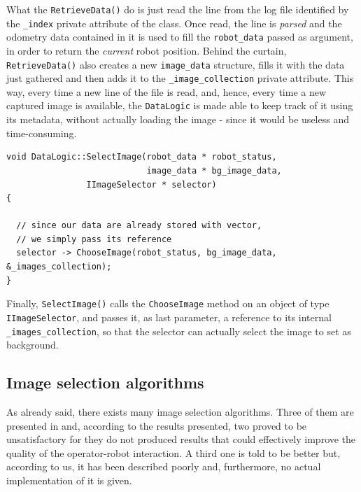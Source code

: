 %
What the \texttt{RetrieveData()} do is just read the line from the log 
file identified by the \texttt{\_index} private attribute of the class.
Once read, the line is \textit{parsed} and the odometry data contained 
in it is used to fill the \texttt{robot\_data} passed as argument, in 
order to return the \textit{current} robot position.
%
Behind the curtain, \texttt{RetrieveData()} also creates a new 
\texttt{image\_data} structure, fills it with the data just 
gathered and then adds it to the \texttt{\_image\_collection} 
private attribute.
%
This way, every time a new line of the file is read, and, hence, 
every time a new captured image is available, the \texttt{DataLogic} 
is made able to keep track of it using its metadata, without actually 
loading the image - since it would be useless and time-consuming.
%
\begin{lstlisting}[caption={\texttt{DataLogic::SelectImage()} method}, label={code:selectimage_method}, frame=trBL]
void DataLogic::SelectImage(robot_data * robot_status,
                            image_data * bg_image_data,
			    IImageSelector * selector)
{

  // since our data are already stored with vector,
  // we simply pass its reference
  selector -> ChooseImage(robot_status, bg_image_data, &_images_collection);
}
\end{lstlisting}
%
Finally, \texttt{SelectImage()} calls the \texttt{ChooseImage} method 
on an object of type \texttt{IImageSelector}, and passes it, as last 
parameter, a reference to its internal \texttt{\_images\_collection}, 
so that the selector can actually select the image to set as 
background.
%
%
%
\subsection{Image selection algorithms}
\label{sub:metrics}
As already said, there exists many image selection algorithms. 
Three of them are presented in \cite{sugimoto} and, according 
to the results presented, two proved to be unsatisfactory for 
they do not produced results that could effectively improve 
the quality of the operator-robot interaction.
%
A third one is told to be better but, according to us, it has 
been described poorly and, furthermore, no actual implementation 
of it is given.
%

